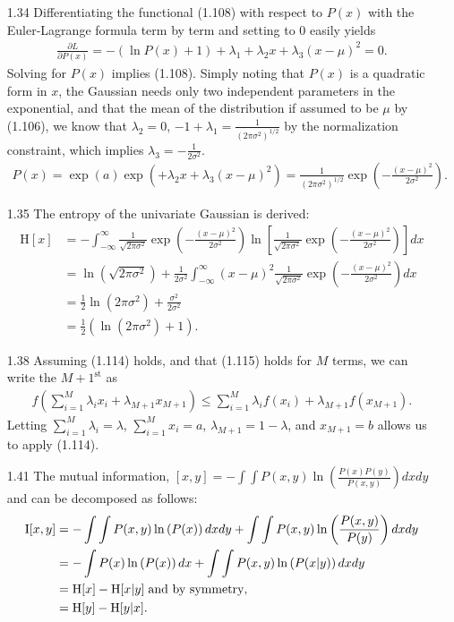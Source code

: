 \documentclass[]{article}
\begin{document}
\begin{enumerate}
 	\item[1.34] Differentiating the functional (1.108) with respect to $P(x)$ with the Euler-Lagrange formula term by term and setting to 0 easily yields
 	\begin{align*}
 	\frac{\partial L}{\partial P(x)}=-(\ln P(x) + 1) + \lambda_1 + \lambda_2x + \lambda_3(x - \mu)^2 = 0.
 	\end{align*}
 	Solving for $P(x)$ implies (1.108). Simply noting that $P(x)$ is a quadratic form in $x$, the Gaussian needs only two independent parameters in the exponential, and that the mean of the distribution if assumed to be $\mu$ by (1.106), we know that $\lambda_2=0$, $-1 + \lambda_1=\frac{1}{(2 \pi \sigma^2)^{1/2}}$ by the normalization constraint, which implies $\lambda_3=-\frac{1}{2\sigma^2}$.
 	\begin{align*}
 	P(x) = \exp\left(a\right)\exp\left( + \lambda_2x + \lambda_3(x - \mu)^2 \right) = \frac{1}{(2 \pi \sigma^2)^{1/2}} \exp \left( - \frac{(x - \mu)^2}{2 \sigma^2} \right).
 	\end{align*}
 	\item[1.35] The entropy of the univariate Gaussian is derived:
 	\begin{align*}
 	\text{H}[x] &= - \int_{-\infty}^{\infty} \frac{1}{\sqrt{2 \pi \sigma^2}} \exp\left( - \frac{(x - \mu)^2}{2 \sigma^2} \right) \ln \left[ \frac{1}{\sqrt{2 \pi \sigma^2}} \exp\left( - \frac{(x - \mu)^2}{2 \sigma^2} \right) \right] dx \\
 	&=\ln\left(\sqrt{2 \pi \sigma^2}\right) + \frac{1}{2 \sigma^2} \int_{-\infty}^{\infty}  (x - \mu)^2 \frac{1}{\sqrt{2 \pi \sigma^2}} \exp\left( - \frac{(x - \mu)^2}{2 \sigma^2} \right) dx \\
 	&=\frac{1}{2}\ln(2\pi \sigma^2) + \frac{\sigma^2}{2\sigma^2} \\
 	& = \frac{1}{2}(\ln(2 \pi \sigma^2) + 1).
 	\end{align*}
 	\item[1.38] Assuming (1.114) holds, and that (1.115) holds for $M$ terms, we can write the $M+1^{\text{st}}$ as
 	\begin{align*}
 	f\left(\sum_{i=1}^{M}\lambda_i x_i + \lambda_{M+1}x_{M+1}\right) \leq \sum_{i=1}^{M}\lambda_i f(x_i) + \lambda_{M+1} f(x_{M+1}).
 	\end{align*}
 	Letting $\sum_{i=1}^{M}\lambda_i=\lambda$, $\sum_{i=1}^{M}x_i = a$, $\lambda_{M+1} = 1-\lambda$, and $x_{M+1}=b$ allows us to apply (1.114).
 	\item[1.41] The mutual information, $[x,y] = -\int \int P(x,y) \ln \left(\frac{P(x) P(y)}{P(x,y)}\right) dx dy$ and can be decomposed as follows:
 	\begin{align*}
 	\text{I}[x,y] &= -\int \int P(x,y) \ln \left(P(x)\right) dx dy + \int \int P(x,y) \ln \left(\frac{P(x,y)}{P(y)}\right) dx dy \\
 	&= - \int P(x) \ln \left(P(x)\right) dx + \int \int P(x,y) \ln \left( P(x|y) \right) dx dy \\
 	&= \text{H}[x] - \text{H}[x|y] \hspace{.1cm} \text{and by symmetry}, \\
 	&= \text{H}[y] - \text{H}[y|x].
 	\end{align*}
 	

\end{enumerate}
\end{document}
